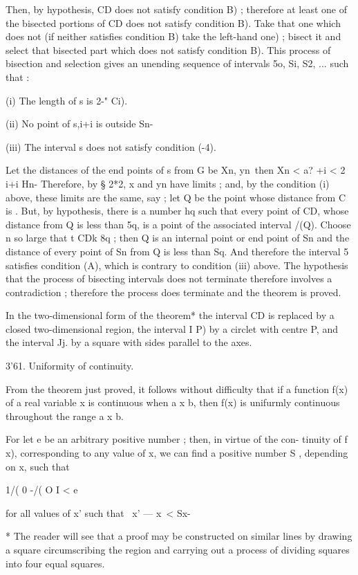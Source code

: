 Then, by hypothesis, CD does not satisfy condition  B) ; therefore at least 
one of the bisected portions of CD does not satisfy condition  B). Take that 
one which does not (if neither satisfies condition  B) take the left-hand one) ; 
bisect it and select that bisected part which does not satisfy condition  B). 
This process of bisection and selection gives an unending sequence of intervals 
5o, Si, S2, ... such that : 

(i) The length of s  is 2-" Ci). 

(ii) No point of s,i+i is outside Sn- 

(iii) The interval s  does not satisfy condition (-4). 

Let the distances of the end points of s  from G be Xn, yn\ then 
Xn < a? +i < 2 i+i   Hn- Therefore, by § 2*2, x  and yn have limits ; and, by the 
condition (i) above, these limits are the same, say   ; let Q be the point whose 
distance from C is  . But, by hypothesis, there is a number hq such that 
every point of CD, whose distance from Q is less than 5q, is a point of the 
associated interval /(Q). Choose n so large that  t CDk 8q ; then Q is an 
internal point or end point of Sn and the distance of every point of Sn from 
Q is less than Sq. And therefore the interval 5  satisfies condition (A), which 
is contrary to condition (iii) above. The hypothesis that the process of 
bisecting intervals does not terminate therefore involves a contradiction ; 
therefore the process does terminate and the theorem is proved. 

In the two-dimensional form of the theorem* the interval CD is replaced by a closed 
two-dimensional region, the interval I P) by a circlet with centre P, and the interval 
Jj. by a square with sides parallel to the axes. 

3'61. Uniformity of continuity. 

From the theorem just proved, it follows without difficulty that if a 
function f(x) of a real variable x is continuous when a x b, then f(x) 
is unifurmly continuous  throughout the range a x  b. 

For let e be an arbitrary positive number ; then, in virtue of the con- 
tinuity of f x), corresponding to any value of x, we can find a positive 
number S , depending on x, such that 

1/( 0 -/( O I < e 

for all values of x' such that \ x' — x\ < Sx- 

* The reader will see that a proof may be constructed on similar lines by drawing a square 
circumscribing the region and carrying out a process of dividing squares into four equal squares. 


